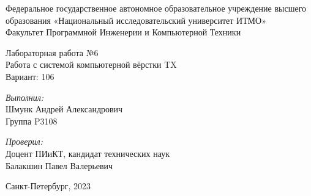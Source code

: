 \documentclass[10pt,onecolumn,a4paper]{article}
\begin{document}
\begin{center}
\large Федеральное государственное автономное образовательное учреждение высшего образования «Национальный исследовательский университет ИТМО»\\
Факультет Программной Инженерии и Компьютерной Техники\\
\hfill 


\vspace{7cm}
\Large Лабораторная работа №6 \\
Работа с системой компьютерной вёрстки TX\\
Вариант: 106\\
\end{center}

\vspace{7.5cm}
 
\begin{flushright}
\textit{Выполнил:}\\
Шмунк Андрей Александрович\\
Группа P3108\

\textit{Проверил:}\\
Доцент ПИиКТ, кандидат технических наук\\
Балакшин Павел Валерьевич\\
\end{flushright}
 
\vfill

\begin{center} Санкт-Петербург, 2023 \end{center}
\end{document}
